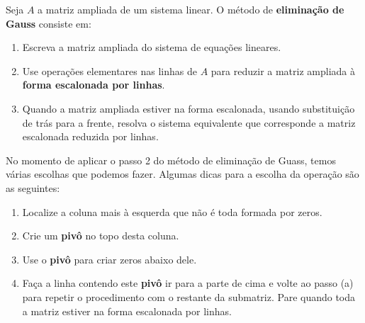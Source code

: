 \begin{definicao}
    Seja $A$ a matriz ampliada de um sistema linear. O método de \textbf{eliminação de Gauss} consiste em:
    \begin{enumerate}[label={\roman*})]
        \item Escreva a matriz ampliada do sistema de equaç\~oes lineares.

        \item Use operaç\~oes elementares nas linhas de $A$ para reduzir a matriz ampliada \`a \textbf{forma escalonada por linhas}.
        
        \item Quando a matriz ampliada estiver na forma escalonada, usando substituição de trás para a frente, resolva o sistema equivalente que corresponde a matriz escalonada reduzida por linhas.
    \end{enumerate}
\end{definicao}

\begin{observacao}
    No momento de aplicar o passo 2 do método de eliminação de Guass, temos várias escolhas que podemos fazer. Algumas dicas para a escolha da operação são as seguintes:
    \begin{enumerate}[label=({\alph*})]
        \item Localize a coluna mais \`a esquerda que não é toda formada por zeros.
        
        \item Crie um \textbf{piv\^o} no topo desta coluna.
         
        \item Use o \textbf{piv\^o} para criar zeros abaixo dele.

        \item Faça a linha contendo este \textbf{piv\^o} ir para a parte de cima e volte ao passo (a) para repetir o procedimento com o restante da submatriz. Pare quando toda a matriz estiver na forma escalonada por linhas.
    \end{enumerate}
\end{observacao}

